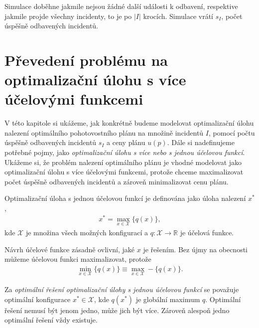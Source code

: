 Simulace doběhne jakmile nejsou žádné další události k odbavení, respektive jakmile projde všechny incidenty, to je po $|I|$ krocích.
Simulace vrátí $s_I$, počet úspěšně odbavených incidentů.

\section{Převedení problému na optimalizační úlohu s více účelovými funkcemi}\label{kap:optUloha2uc}

V této kapitole si ukážeme, jak konkrétně budeme modelovat optimalizační úlohu nalezení optimálního pohotovostního plánu na množině incidentů $I$,
pomocí počtu úspěšně odbavených incidentů $s_I$ a ceny plánu $u(p)$.
Dále si nadefinujeme potřebné pojmy, jako \textit{optimalizační úlohu s více nebo s jednou účelovou funkcí}.
Ukážeme si, že problém nalezení optimálního plánu je vhodné modelovat jako optimalizační úlohu s více účelovými funkcemi,
protože chceme maximalizovat počet úspěšně odbavených incidentů a zároveň minimalizovat cenu plánu.

\begin{definice}\label{df:optUloha1ucObecne}
  Optimalizační úloha s jednou účelovou funkcí je definována jako úloha nalezení $x^*$,
  \begin{align}
    x^* = \max_{x \in \mathcal{X}} \{ q(x) \},
  \end{align}
  kde $\mathcal{X}$ je množina všech možných konfigurací a $q \colon \mathcal{X} \rightarrow \mathbb{R}$ je účelová funkce.
\end{definice}

Návrh účelové funkce zásadně ovlivní, jaké $x$ je řešením.
Bez újmy na obecnosti můžeme účelovou funkci maximalizovat, protože
\begin{align*}
  \min_{x \in \mathcal{X}} \{ q(x) \} \equiv \max_{x \in \mathcal{X}} - \{ q(x) \}.
\end{align*}

Za \textit{optimální řešení optimalizační úlohy s jednou účelovou funkcí} se považuje optimální konfigurace $x^* \in \mathcal{X}$,
kde $q(x^*)$ je globální maximum $q$.
Optimální řešení nemusí být jenom jedno, může jich být více. Zároveň alespoň jedno optimální řešení vždy existuje.

